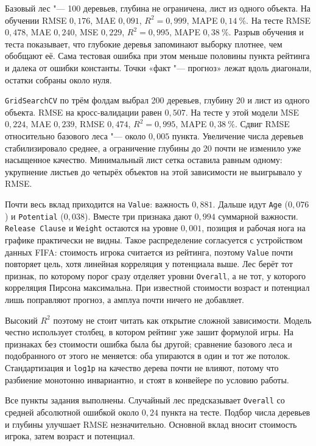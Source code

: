 \documentclass[14pt]{extarticle}
\begin{document}
Базовый лес "--- 100 деревьев, глубина не ограничена, лист из одного объекта. На обучении RMSE $0{,}176$, MAE $0{,}091$, $R^2 = 0{,}999$, MAPE $0{,}14~\%$. На тесте RMSE $0{,}478$, MAE $0{,}240$, MSE $0{,}229$, $R^2 = 0{,}995$, MAPE $0{,}38~\%$. Разрыв обучения и теста показывает, что глубокие деревья запоминают выборку плотнее, чем обобщают её. Сама тестовая ошибка при этом меньше половины пункта рейтинга и далека от ошибки константы. Точки «факт "--- прогноз» лежат вдоль диагонали, остатки собраны около нуля.

\texttt{GridSearchCV} по трём фолдам выбрал 200 деревьев, глубину 20 и лист из одного объекта. RMSE на кросс-валидации равен $0{,}507$. На тесте у этой модели MSE $0{,}224$, MAE $0{,}239$, RMSE $0{,}474$, $R^2 = 0{,}995$, MAPE $0{,}38~\%$. Сдвиг RMSE относительно базового леса "--- около $0{,}005$ пункта. Увеличение числа деревьев стабилизировало среднее, а ограничение глубины до 20 почти не изменило уже насыщенное качество. Минимальный лист сетка оставила равным одному: укрупнение листьев до четырёх объектов на этой зависимости не выигрывало у RMSE.

Почти весь вклад приходится на \texttt{Value}: важность $0{,}881$. Дальше идут \texttt{Age} ($0{,}076$) и \texttt{Potential} ($0{,}038$). Вместе три признака дают $0{,}994$ суммарной важности. \texttt{Release Clause} и \texttt{Weight} остаются на уровне $0{,}001$, позиция и рабочая нога на графике практически не видны. Такое распределение согласуется с устройством данных FIFA: стоимость игрока считается из рейтинга, поэтому \texttt{Value} почти повторяет цель, хотя линейная корреляция у потенциала выше. Лес берёт тот признак, по которому порог сразу отделяет уровни \texttt{Overall}, а не тот, у которого корреляция Пирсона максимальна. При известной стоимости возраст и потенциал лишь поправляют прогноз, а амплуа почти ничего не добавляет.

Высокий $R^2$ поэтому не стоит читать как открытие сложной зависимости. Модель честно использует столбец, в котором рейтинг уже зашит формулой игры. На признаках без стоимости ошибка была бы другой; сравнение базового леса и подобранного от этого не меняется: оба упираются в один и тот же потолок. Стандартизация и \texttt{log1p} на качество дерева почти не влияют, потому что разбиение монотонно инвариантно, и стоят в конвейере по условию работы.

Все пункты задания выполнены. Случайный лес предсказывает \texttt{Overall} со средней абсолютной ошибкой около $0{,}24$ пункта на тесте. Подбор числа деревьев и глубины улучшает RMSE незначительно. Основной вклад вносит стоимость игрока, затем возраст и потенциал.
\end{document}
